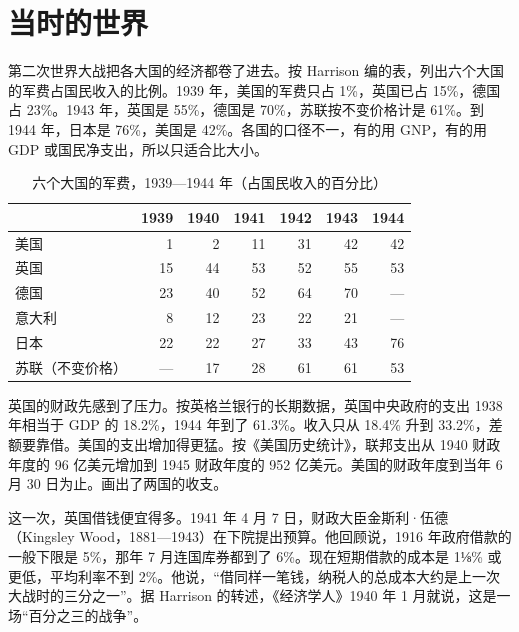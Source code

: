 \section{当时的世界}\label{sec:warfinance-world}

第二次世界大战把各大国的经济都卷了进去。按 Harrison 编的表，列出六个大国的军费占国民收入的比例\cite{harrison1998a}。1939 年，美国的军费只占 1\%，英国已占 15\%，德国占 23\%\cite{harrison1998a}。1943 年，英国是 55\%，德国是 70\%，苏联按不变价格计是 61\%\cite{harrison1998a}。到 1944 年，日本是 76\%，美国是 42\%\cite{harrison1998a}。各国的口径不一，有的用 GNP，有的用 GDP 或国民净支出，所以只适合比大小。

\begin{table}[tbp]
\centering\small
\caption{六个大国的军费，1939—1944 年（占国民收入的百分比）}\label{tab:warfinance-mobilization}
\begin{tabularx}{\linewidth}{@{}X r r r r r r@{}}
\toprule
 & 1939 & 1940 & 1941 & 1942 & 1943 & 1944 \\
\midrule
美国 & 1 & 2 & 11 & 31 & 42 & 42 \\
英国 & 15 & 44 & 53 & 52 & 55 & 53 \\
德国 & 23 & 40 & 52 & 64 & 70 & — \\
意大利 & 8 & 12 & 23 & 22 & 21 & — \\
日本 & 22 & 22 & 27 & 33 & 43 & 76 \\
苏联（不变价格） & — & 17 & 28 & 61 & 61 & 53 \\
\bottomrule
\end{tabularx}
\end{table}

英国的财政先感到了压力。按英格兰银行的长期数据，英国中央政府的支出 1938 年相当于 GDP 的 18.2\%，1944 年到了 61.3\%\cite{boe2017}。收入只从 18.4\% 升到 33.2\%，差额要靠借\cite{boe2017}。美国的支出增加得更猛。按《美国历史统计》，联邦支出从 1940 财政年度的 96 亿美元增加到 1945 财政年度的 952 亿美元\cite{census1975y34}。美国的财政年度到当年 6 月 30 日为止。画出了两国的收支。

这一次，英国借钱便宜得多。1941 年 4 月 7 日，财政大臣金斯利·伍德（Kingsley Wood，1881—1943）在下院提出预算\cite{hansard1941,loc34}。他回顾说，1916 年政府借款的一般下限是 5\%，那年 7 月连国库券都到了 6\%\cite{hansard1941}。现在短期借款的成本是 1⅛\% 或更低，平均利率不到 2\%\cite{hansard1941}。他说，“借同样一笔钱，纳税人的总成本大约是上一次大战时的三分之一”\cite{hansard1941}。据 Harrison 的转述，《经济学人》1940 年 1 月就说，这是一场“百分之三的战争”\cite{harrison1992}。

